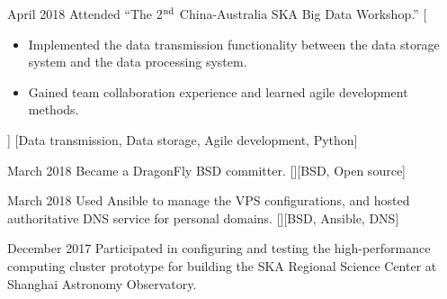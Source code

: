 \documentclass{resume}
\begin{document}
\begin{experiences}
  \experience
    {April 2018}%
    {Attended \enquote{The 2$^{\rm nd}$ China-Australia SKA Big Data Workshop.}}%
    [\begin{itemize}
      \item Implemented the data transmission functionality between the
        data storage system and the
        data processing system.
      \item Gained team collaboration experience and
        learned agile development methods.
    \end{itemize}]%
    [Data transmission, Data storage, Agile development, Python]

  \separator{0.5em}
  \experience
    {March 2018}%
    {Became a DragonFly BSD committer.}%
    [][BSD, Open source]

  \separator{0.5em}
  \experience
    {March 2018}%
    {Used Ansible to manage the VPS configurations,
      and hosted authoritative DNS service for personal domains.}%
    [][BSD, Ansible, DNS]


  \separator{0.5em}
  \experience
    {December 2017}%
    {Participated in configuring and testing the high-performance computing
      cluster prototype for building the SKA Regional Science Center at
      Shanghai Astronomy Observatory.}




\end{experiences}
\end{document}
